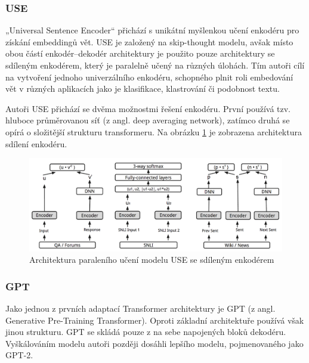\documentclass[thesis=M,czech]{FITthesis}[2019/12/23]
\begin{document}
\subsubsection{USE}
„Universal Sentence Encoder“\cite{cer2018} přichází s unikátní myšlenkou učení enkodéru pro získání embeddingů vět. USE je založený na skip-thought modelu, avšak místo obou částí enkodér--dekodér architektury je použito pouze architektury se sdíleným enkodérem, který je paralelně učený na různých úlohách. Tím autoři cílí na vytvoření jednoho univerzálního enkodéru, schopného plnit roli embedování vět v různých aplikacích jako je klasifikace, klastrování či podobnost textu.

Autoři USE přichází se dvěma možnostmi řešení enkodéru. První používá tzv. hluboce průměrovanou síť (z angl. deep averaging network), zatímco druhá se opírá o složitější strukturu transformeru\cite{yang2018}.
 Na obrázku \ref{fig:yang2018USE} je zobrazena architektura sdílení enkodéru.
\begin{figure}\centering
	\includegraphics[width=\textwidth]{images/yang2018_USE.png}
	\caption{Architektura paraleního učení modelu USE se sdíleným enkodérem\cite{yang2018}}\label{fig:yang2018USE}
\end{figure}

\subsubsection{GPT}
Jako jednou z prvních adaptací Transformer architektury je GPT (z angl. Generative Pre-Training Transformer)\cite{radford2018}. Oproti základní architektuře používá však jinou strukturu. GPT se skládá pouze z na sebe napojených bloků dekodéru. Vyškálováním modelu autoři později dosáhli lepšího modelu, pojmenovaného jako GPT-2\cite{radford2019}.
\end{document}
